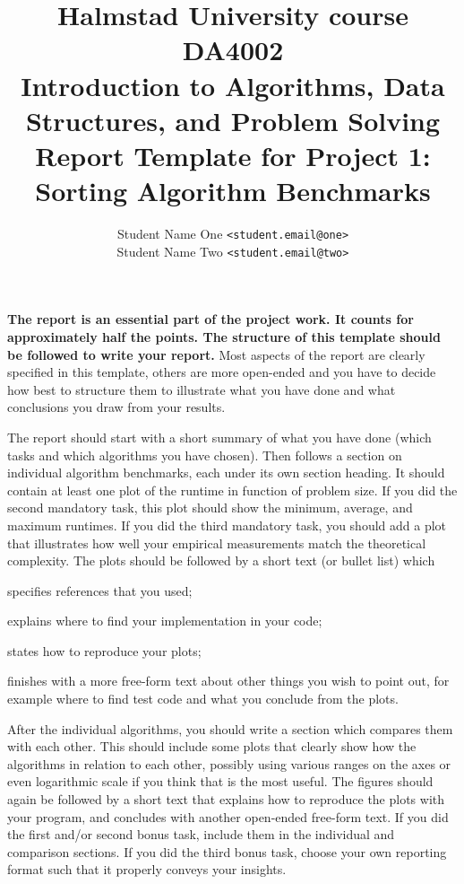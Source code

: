 \documentclass[a4paper,10pt]{article}
\begin{document}
\title{
  {\small
    Halmstad University course DA4002\\
    Introduction to Algorithms, Data Structures, and Problem Solving\\
  }
  Report Template for Project 1:\\
  Sorting Algorithm Benchmarks
}
\author{
  Student Name One \texttt{<student.email@one>}\\
  Student Name Two \texttt{<student.email@two>}
}
\maketitle



{\itshape

\vfill

\textbf{The report is an essential part of the project work.
It counts for approximately half the points.
The structure of this template should be followed to write your report.}
Most aspects of the report are clearly specified in this template, others are more open-ended and you have to decide how best to structure them to illustrate what you have done and what conclusions you draw from your results.

\vfill

The report should start with a short summary of what you have done (which tasks and which algorithms you have chosen).
Then follows a section on individual algorithm benchmarks, each under its own section heading.
It should contain at least one plot of the runtime in function of problem size.
If you did the second mandatory task, this plot should show the minimum, average, and maximum runtimes.
If you did the third mandatory task, you should add a plot that illustrates how well your empirical measurements match the theoretical complexity.
The plots should be followed by a short text (or bullet list) which
\begin{compactitem}
\item
  specifies references that you used;
\item
  explains where to find your implementation in your code;
\item
  states how to reproduce your plots;
\item
  finishes with a more free-form text about other things you wish to point out, for example where to find test code and what you conclude from the plots.
\end{compactitem}

After the individual algorithms, you should write a section which compares them with each other.
This should include some plots that clearly show how the algorithms in relation to each other, possibly using various ranges on the axes or even logarithmic scale if you think that is the most useful.
The figures should again be followed by a short text that explains how to reproduce the plots with your program, and concludes with another open-ended free-form text.
If you did the first and/or second bonus task, include them in the individual and comparison sections.
If you did the third bonus task, choose your own reporting format such that it properly conveys your insights.

}
\end{document}
